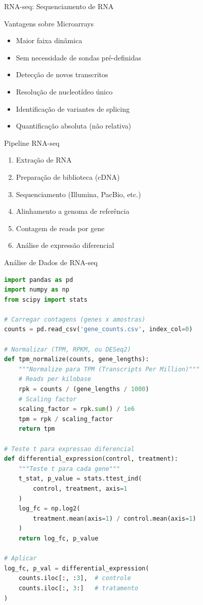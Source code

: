 \begin{frame}[shrink=15]{RNA-seq: Sequenciamento de RNA}
\begin{block}{Vantagens sobre Microarrays}
\begin{itemize}
    \item Maior faixa dinâmica
    \item Sem necessidade de sondas pré-definidas
    \item Detecção de novos transcritos
    \item Resolução de nucleotídeo único
    \item Identificação de variantes de splicing
    \item Quantificação absoluta (não relativa)
\end{itemize}
\end{block}

\vspace{0.3cm}

\begin{exampleblock}{Pipeline RNA-seq}
\begin{enumerate}
    \item Extração de RNA
    \item Preparação de biblioteca (cDNA)
    \item Sequenciamento (Illumina, PacBio, etc.)
    \item Alinhamento a genoma de referência
    \item Contagem de reads por gene
    \item Análise de expressão diferencial
\end{enumerate}
\end{exampleblock}
\end{frame}

\begin{frame}[fragile, shrink=15]{Análise de Dados de RNA-seq}
\begin{lstlisting}[language=Python, caption=Análise de expressão diferencial, basicstyle=\ttfamily\tiny]
import pandas as pd
import numpy as np
from scipy import stats

# Carregar contagens (genes x amostras)
counts = pd.read_csv('gene_counts.csv', index_col=0)

# Normalizar (TPM, RPKM, ou DESeq2)
def tpm_normalize(counts, gene_lengths):
    """Normalize para TPM (Transcripts Per Million)"""
    # Reads per kilobase
    rpk = counts / (gene_lengths / 1000)
    # Scaling factor
    scaling_factor = rpk.sum() / 1e6
    tpm = rpk / scaling_factor
    return tpm

# Teste t para expressao diferencial
def differential_expression(control, treatment):
    """Teste t para cada gene"""
    t_stat, p_value = stats.ttest_ind(
        control, treatment, axis=1
    )
    log_fc = np.log2(
        treatment.mean(axis=1) / control.mean(axis=1)
    )
    return log_fc, p_value

# Aplicar
log_fc, p_val = differential_expression(
    counts.iloc[:, :3],  # controle
    counts.iloc[:, 3:]   # tratamento
)
\end{lstlisting}
\end{frame}

